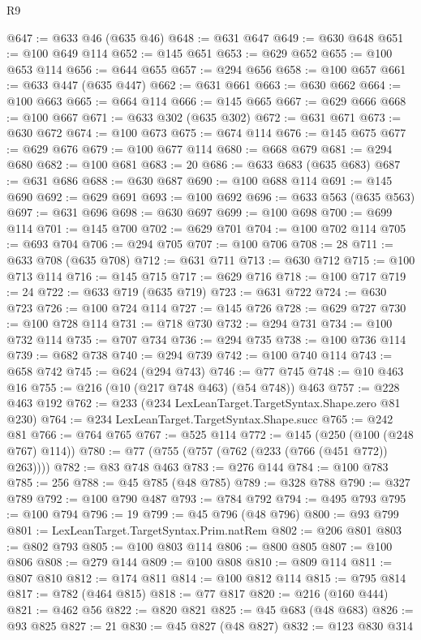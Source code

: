 \begin{lexlean}{R9}
\begin{coremodule}
{{{{{{{{{{{{{{{{{{{{{{{{{{{{{{{{{{{{{{{{{{{{{{{{{{{{{{{{{{{{{{{{{{{{{{{{{{{{{{{{{{{{{{{{{{{{{{{{{{{{{{{{{{{{@647 := @633 @46 (@635 @46)
@648 := @631 @647
@649 := @630 @648
@651 := @100 @649 @114
@652 := @145 @651
@653 := @629 @652
@655 := @100 @653 @114
@656 := @644 @655
@657 := @294 @656
@658 := @100 @657
@661 := @633 @447 (@635 @447)
@662 := @631 @661
@663 := @630 @662
@664 := @100 @663
@665 := @664 @114
@666 := @145 @665
@667 := @629 @666
@668 := @100 @667
@671 := @633 @302 (@635 @302)
@672 := @631 @671
@673 := @630 @672
@674 := @100 @673
@675 := @674 @114
@676 := @145 @675
@677 := @629 @676
@679 := @100 @677 @114
@680 := @668 @679
@681 := @294 @680
@682 := @100 @681
@683 := 20
@686 := @633 @683 (@635 @683)
@687 := @631 @686
@688 := @630 @687
@690 := @100 @688 @114
@691 := @145 @690
@692 := @629 @691
@693 := @100 @692
@696 := @633 @563 (@635 @563)
@697 := @631 @696
@698 := @630 @697
@699 := @100 @698
@700 := @699 @114
@701 := @145 @700
@702 := @629 @701
@704 := @100 @702 @114
@705 := @693 @704
@706 := @294 @705
@707 := @100 @706
@708 := 28
@711 := @633 @708 (@635 @708)
@712 := @631 @711
@713 := @630 @712
@715 := @100 @713 @114
@716 := @145 @715
@717 := @629 @716
@718 := @100 @717
@719 := 24
@722 := @633 @719 (@635 @719)
@723 := @631 @722
@724 := @630 @723
@726 := @100 @724 @114
@727 := @145 @726
@728 := @629 @727
@730 := @100 @728 @114
@731 := @718 @730
@732 := @294 @731
@734 := @100 @732 @114
@735 := @707 @734
@736 := @294 @735
@738 := @100 @736 @114
@739 := @682 @738
@740 := @294 @739
@742 := @100 @740 @114
@743 := @658 @742
@745 := @624 (@294 @743)
@746 := @77 @745
@748 := @10 @463 @16
@755 := @216 (@10 (@217 @748 @463) (@54 @748)) @463
@757 := @228 @463 @192
@762 := @233 (@234 LexLeanTarget.TargetSyntax.Shape.zero @81 @230)
@764 := @234 LexLeanTarget.TargetSyntax.Shape.succ
@765 := @242 @81
@766 := @764 @765
@767 := @525 @114
@772 := @145 (@250 (@100 (@248 @767) @114))
@780 := @77 (@755 (@757 (@762 (@233 (@766 (@451 @772)) @263))))
@782 := @83 @748 @463
@783 := @276 @144
@784 := @100 @783
@785 := 256
@788 := @45 @785 (@48 @785)
@789 := @328 @788
@790 := @327 @789
@792 := @100 @790 @487
@793 := @784 @792
@794 := @495 @793
@795 := @100 @794
@796 := 19
@799 := @45 @796 (@48 @796)
@800 := @93 @799
@801 := LexLeanTarget.TargetSyntax.Prim.natRem
@802 := @206 @801
@803 := @802 @793
@805 := @100 @803 @114
@806 := @800 @805
@807 := @100 @806
@808 := @279 @144
@809 := @100 @808
@810 := @809 @114
@811 := @807 @810
@812 := @174 @811
@814 := @100 @812 @114
@815 := @795 @814
@817 := @782 (@464 @815)
@818 := @77 @817
@820 := @216 (@160 @444)
@821 := @462 @56
@822 := @820 @821
@825 := @45 @683 (@48 @683)
@826 := @93 @825
@827 := 21
@830 := @45 @827 (@48 @827)
@832 := @123 @830 @314
}}}}}}}}}}}}}}}}}}}}}}}}}}}}}}}}}}}}}}}}}}}}}}}}}}}}}}}}}}}}}}}}}}}}}}}}}}}}}}}}}}}}}}}}}}}}}}}}}}}}}}}}}}}}
\end{coremodule}
\end{lexlean}
